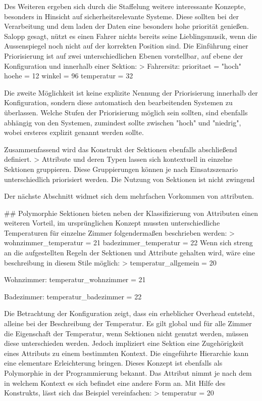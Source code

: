 Des Weiteren ergeben sich durch die Staffelung weitere interessante Konzepte, besonders in Hinsicht auf sicherheitsrelevante Systeme. Diese sollten bei der Verarbeitung und dem laden der Daten eine besonders hohe priorität genießen. Salopp gesagt, nützt es einen Fahrer nichts bereits seine Lieblingsmusik, wenn die Aussenspiegel noch nicht auf der korrekten Position sind. Die Einführung einer Priorisierung ist auf zwei unterschiedlichen Ebenen vorstellbar, auf ebene der Konfiguration und innerhalb einer Sektion: 
> Fahrersitz:
		prioritaet = "hoch"
		hoehe = 12
		winkel = 96
		temperatur = 32

Die zweite Möglichkeit ist keine explizite Nennung der Priorisierung innerhalb der Konfiguration, sondern diese automatisch den bearbeitenden Systemen zu überlassen. 
Welche Stufen der Priorisierung möglich sein sollten, sind ebenfalls abhängig von den Systemen, zumindest sollte zwischen "hoch" und "niedrig", wobei ersteres explizit genannt werden sollte. 

Zusammenfassend wird das Konstrukt der Sektionen ebenfalls abschließend definiert.
> Attribute und deren Typen lassen sich kontextuell in einzelne Sektionen gruppieren. Diese Gruppierungen können je nach Einsatzszenario unterschiedlich priorisiert werden. Die Nutzung von Sektionen ist nicht zwingend

Der nächste Abschnitt widmet sich dem mehrfachen Vorkommen von attributen.

## Polymorphie
Sektionen bieten neben der Klassifizierung von Attributen einen weiteren Vorteil, im ursprünglichen Konzept mussten unterschiedliche Temperaturen für einzelne Zimmer folgendermaßen beschrieben werden:
> wohnzimmer_temperatur = 21
	badezimmer_temperatur = 22
Wenn sich streng an die aufgestellten Regeln der Sektionen und Attribute gehalten wird, wäre eine beschreibung in diesem Stile möglich: 
> temperatur_allgemein = 20
	
	Wohnzimmer: 
		temperatur_wohnzimmer = 21
	
	Badezimmer: 
		temperatur_badezimmer = 22

Die Betrachtung der Konfiguration zeigt, dass ein erheblicher Overhead entsteht, alleine bei der Beschreibung der Temperatur. Es gilt global und für alle Zimmer die Eigenschaft der Temperatur, wenn Sektionen nicht genutzt werden, müssen diese unterschieden werden. Jedoch impliziert eine Sektion eine Zugehörigkeit eines Attributs zu einem bestimmten Kontext. Die eingeführte Hierarchie kann eine elementare Erleichterung bringen. Dieses Konzept ist ebenfalls als Polymorphie in der Programmierung bekannt. Das Attribut nimmt je nach dem in welchem Kontext es sich befindet eine andere Form an. Mit Hilfe des Konstrukts, lässt sich das Beispiel vereinfachen: 
> temperatur = 20
	
